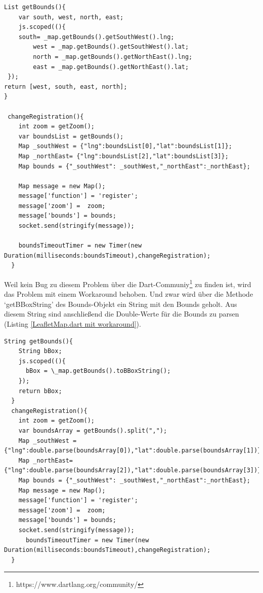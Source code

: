 \begin{lstlisting}[caption= LeafletMap.dart mit ursprünglicher Abfrage des Bounds-Objektes, label= LeafletMap.dart]
  List getBounds(){
    var south, west, north, east;
    js.scoped((){
    south= _map.getBounds().getSouthWest().lng;
        west = _map.getBounds().getSouthWest().lat;
        north = _map.getBounds().getNorthEast().lng;
        east = _map.getBounds().getNorthEast().lat;
 });
return [west, south, east, north];
}

 changeRegistration(){
    int zoom = getZoom();
    var boundsList = getBounds();
    Map _southWest = {"lng":boundsList[0],"lat":boundsList[1]};
    Map _northEast= {"lng":boundsList[2],"lat":boundsList[3]};
    Map bounds = {"_southWest": _southWest,"_northEast":_northEast};

    Map message = new Map();
    message['function'] = 'register';
    message['zoom'] =  zoom;
    message['bounds'] = bounds;
    socket.send(stringify(message));
    
    boundsTimeoutTimer = new Timer(new Duration(milliseconds:boundsTimeout),changeRegistration);  
  }
\end{lstlisting}
Weil kein Bug zu diesem Problem über die Dart-Communiy\footnote{https://www.dartlang.org/community/} zu finden ist, wird das Problem mit einem Workaround behoben. Und zwar wird über die Methode ‘getBBoxString’ des Bounds-Objekt ein String mit den Bounds geholt. Aus diesem String sind anschließend die Double-Werte für die Bounds zu parsen (Listing \ref{LeafletMap.dart mit workaround}).
\begin{lstlisting}[caption= LeafletMap.dart mit workaround über BBoxString, label= LeafletMap.dart mit workaround]
String getBounds(){
    String bBox;
    js.scoped((){
      bBox = \_map.getBounds().toBBoxString();
    });
    return bBox;
  }
  changeRegistration(){
    int zoom = getZoom();
    var boundsArray = getBounds().split(",");
    Map _southWest = {"lng":double.parse(boundsArray[0]),"lat":double.parse(boundsArray[1])};
    Map _northEast= {"lng":double.parse(boundsArray[2]),"lat":double.parse(boundsArray[3])};
    Map bounds = {"_southWest": _southWest,"_northEast":_northEast};
    Map message = new Map();
    message['function'] = 'register';
    message['zoom'] =  zoom;
    message['bounds'] = bounds;
    socket.send(stringify(message));
      boundsTimeoutTimer = new Timer(new Duration(milliseconds:boundsTimeout),changeRegistration);  
  }
\end{lstlisting}

